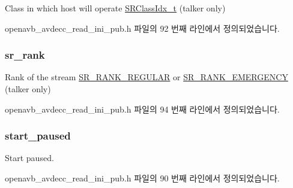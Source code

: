 Class in which host will operate \hyperlink{openavb__types__base__pub_8h_a4d8ccbeaf8ad040d8880e8971fc62752}{S\+R\+Class\+Idx\+\_\+t} (talker only) 



openavb\+\_\+avdecc\+\_\+read\+\_\+ini\+\_\+pub.\+h 파일의 92 번째 라인에서 정의되었습니다.

\subsubsection[{\texorpdfstring{sr\+\_\+rank}{sr_rank}}]{ sr\+\_\+rank}\hypertarget{structopenavb__tl__data__cfg_aec168f739a62e7d1167959b587d0a50b}{}\label{structopenavb__tl__data__cfg_aec168f739a62e7d1167959b587d0a50b}


Rank of the stream \hyperlink{openavb__types__base__pub_8h_ae2247245210ff7d9b305530e79921b04}{S\+R\+\_\+\+R\+A\+N\+K\+\_\+\+R\+E\+G\+U\+L\+AR} or \hyperlink{openavb__types__base__pub_8h_afc788727fb40393561024641cee8f6c8}{S\+R\+\_\+\+R\+A\+N\+K\+\_\+\+E\+M\+E\+R\+G\+E\+N\+CY} (talker only) 



openavb\+\_\+avdecc\+\_\+read\+\_\+ini\+\_\+pub.\+h 파일의 94 번째 라인에서 정의되었습니다.

\subsubsection[{\texorpdfstring{start\+\_\+paused}{start_paused}}]{ start\+\_\+paused}\hypertarget{structopenavb__tl__data__cfg_a0983af523b1f3fd4392c902ccf862905}{}\label{structopenavb__tl__data__cfg_a0983af523b1f3fd4392c902ccf862905}


Start paused. 



openavb\+\_\+avdecc\+\_\+read\+\_\+ini\+\_\+pub.\+h 파일의 90 번째 라인에서 정의되었습니다.

